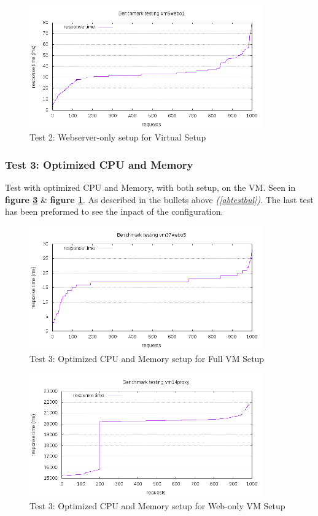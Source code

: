  
\begin{figure}[H]
    \centering
    \includegraphics[width=10cm]{Pictures/abresult_vm_2.png}
    \caption{Test 2: Webserver-only setup for Virtual Setup}
    \label{fig:resA2hw}
\end{figure} 
\clearpage
\subsubsection{Test 3: Optimized CPU and Memory}
Test with optimized CPU and Memory, with both setup, on the VM. Seen in \textbf{figure \ref{fig:resA3vm2}} \& \textbf{figure \ref{fig:resA2hw}}. As described in the bullets above \textit{(\ref{abtestbul})}. The last test has been preformed to see the inpact of the configuration.
 \begin{figure}[H]
    \centering
    \includegraphics[width=10cm]{Pictures/abresult_vm_3a.png}
    \caption{Test 3: Optimized CPU and Memory setup for Full VM Setup}
    \label{fig:resA3vm1}
\end{figure}
   
\begin{figure}[H]
    \centering
    \includegraphics[width=10cm]{Pictures/abresult_vm_3b.png}
    \caption{Test 3: Optimized CPU and Memory setup for Web-only VM Setup}
    \label{fig:resA3vm2}
\end{figure} 